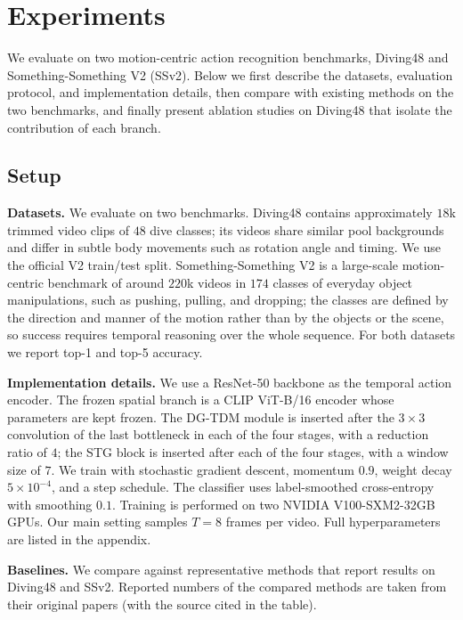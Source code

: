 \section{Experiments}
\label{sec:experiments}

We evaluate \dgtdm on two motion-centric action recognition benchmarks,
Diving48 and Something-Something V2 (SSv2). Below we first describe the
datasets, evaluation protocol, and implementation details, then compare
\dgtdm with existing methods on the two benchmarks, and finally present
ablation studies on Diving48 that isolate the contribution of each branch.

\subsection{Setup}
\label{sec:setup}

\textbf{Datasets.}
We evaluate on two benchmarks. Diving48 \cite{diving48} contains approximately
$18$k trimmed video clips of $48$ dive classes; its videos share similar pool
backgrounds and differ in subtle body movements such as rotation angle and
timing. We use the official V2 train/test split. Something-Something V2
\cite{goyal2017ssv2} is a large-scale motion-centric benchmark of around $220$k
videos in $174$ classes of everyday object manipulations, such as pushing,
pulling, and dropping; the classes are defined by the direction and manner of
the motion rather than by the objects or the scene, so success requires
temporal reasoning over the whole sequence. For both datasets we report top-1
and top-5 accuracy.

\textbf{Implementation details.}
We use a ResNet-50 backbone as the temporal action encoder. The frozen spatial
branch is a CLIP ViT-B/16 encoder whose parameters are kept frozen. The DG-TDM
module is inserted after the $3\times3$ convolution of the last bottleneck in
each of the four stages, with a reduction ratio of $4$; the STG block is
inserted after each of the four stages, with a window size of
$7$. We train with stochastic gradient descent, momentum $0.9$, weight decay
$5\times10^{-4}$, and a step schedule. The classifier uses label-smoothed
cross-entropy with smoothing $0.1$. Training is performed on two NVIDIA
V100-SXM2-32GB GPUs. Our main setting samples $T=8$ frames per video. Full
hyperparameters are listed in the appendix.

\textbf{Baselines.}
We compare against representative methods that report results on Diving48 and
SSv2. Reported numbers of the compared methods are taken from their original
papers (with the source cited in the table).

